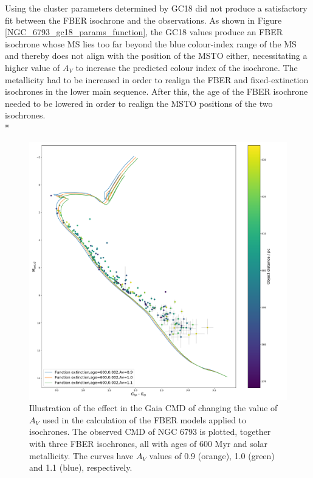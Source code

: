 \documentclass[12pt, a4paper]{report}
\begin{document}
Using the cluster parameters determined by GC18 did not produce a satisfactory fit between the FBER isochrone and the observations. As shown in Figure \ref{NGC_6793_gc18_params_function}, the GC18 values produce an FBER isochrone whose MS lies too far beyond the blue colour-index range of the MS and thereby does not align with the position of the MSTO either, necessitating a higher value of $A_{V}$ to increase the predicted colour index of the isochrone. The metallicity had to be increased in order to realign the FBER and fixed-extinction isochrones in the lower main sequence. After this, the age of the FBER isochrone needed to be lowered in order to realign the MSTO positions of the two isochrones.\\*

\begin{figure}[h!]
\begin{center}
\includegraphics[width=1.0\textwidth]{../NGC_6793_CMD_FeH_0p002_Av_0p9_1p0_1p1_600Myr_isochrones_func_errorbars_T5k.pdf}
\caption{Illustration of the effect in the Gaia CMD of changing the value of $A_{V}$ used in the calculation of the FBER models applied to isochrones. The observed CMD of NGC 6793 is plotted, together with three FBER isochrones, all with ages of 600 Myr and solar metallicity. The curves have $A_{V}$ values of 0.9 (orange), 1.0 (green) and 1.1 (blue), respectively.}
\label{NGC_6793_Av_var}
\end{center}
\end{figure}
\end{document}
